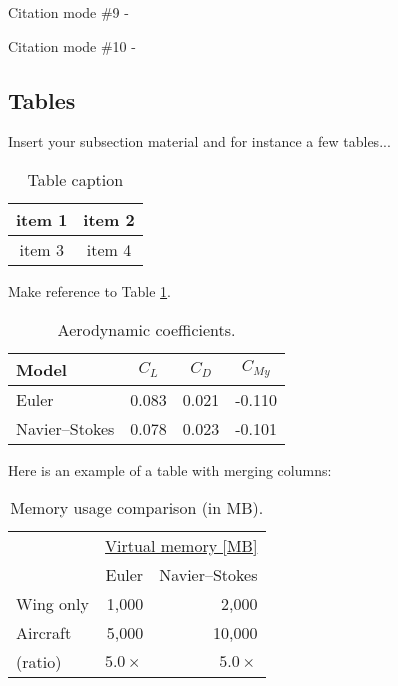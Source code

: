 Citation mode \#9 - \quad \citeyear{jameson:adjointns}

Citation mode \#10 - \quad \citeyearpar{jameson:adjointns}


\subsection{Tables}
\label{subsection:tables}

Insert your subsection material and for instance a few tables...

\begin{table}[h!]
  \begin{center}
    \begin{tabular}{|c|c|}
      \hline
      item 1 & item 2 \\
      \hline
      item 3 & item 4 \\
      \hline
    \end{tabular}
  \end{center}
  \caption[Table caption shown in TOC]{Table caption}
  \label{table:simple}
\end{table}

Make reference to Table \ref{table:simple}.

\begin{table}[!htb]
  \begin{center}
    \begin{tabular}{lccc}
      Model           & $C_L$ & $C_D$ & $C_{M y}$ \\
      \hline
      Euler           & 0.083 & 0.021 & -0.110    \\
      Navier--Stokes  & 0.078 & 0.023 & -0.101    \\
      \hline
    \end{tabular}
  \end{center}
  \caption{Aerodynamic coefficients.}
  \label{tab:aeroCoeff}
\end{table}

Here is an example of a table with merging columns:

\begin{table}[!htb]
  \begin{center}
    \begin{tabular}[]{lrr}
      \hline
                     & \multicolumn{2}{c}{\underline{Virtual memory [MB]}} \\
                     & Euler       & Navier--Stokes \\
      \hline
      Wing only      &  1,000      &    2,000       \\
      Aircraft       &  5,000      &   10,000       \\
      (ratio)        & $5.0\times$ & $5.0\times$    \\
      \hline
    \end{tabular}
  \end{center}
  \caption{Memory usage comparison (in MB).}
  \label{tab:memory}
\end{table}


